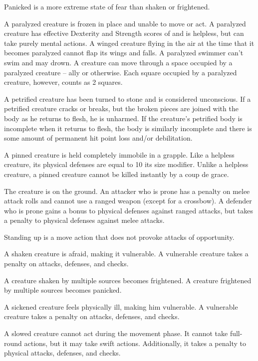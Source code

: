 Panicked is a more extreme state of fear than shaken or frightened.

 A paralyzed creature is frozen in place and unable to move or act. A paralyzed creature has effective Dexterity and Strength scores of  and is helpless, but can take purely mental actions. A winged creature flying in the air at the time that it becomes paralyzed cannot flap its wings and falls. A paralyzed swimmer can't swim and may drown. A creature can move through a space occupied by a paralyzed creature -- ally or otherwise. Each square occupied by a paralyzed creature, however, counts as 2 squares.

 A petrified creature has been turned to stone and is considered unconscious. If a petrified creature cracks or breaks, but the broken pieces are joined with the body as he returns to flesh, he is unharmed. If the creature's petrified body is incomplete when it returns to flesh, the body is similarly incomplete and there is some amount of permanent hit point loss and/or debilitation.

 A pinned creature is held completely immobile in a grapple. Like a helpless creature, its physical defenses are equal to 10 \add its size modifier. Unlike a helpless creature, a pinned creature cannot be killed instantly by a coup de grace.

 The creature is on the ground. An attacker who is prone has a  penalty on melee attack rolls and cannot use a ranged weapon (except for a crossbow). A defender who is prone gains a  bonus to physical defenses against ranged attacks, but takes a  penalty to physical defenses against melee attacks.

Standing up is a move action that does not provoke attacks of opportunity.

 A shaken creature is afraid, making it vulnerable. A vulnerable creature takes a  penalty on attacks, defenses, and checks.

A creature shaken by multiple sources becomes frightened. A creature frightened by multiple sources becomes panicked.

 A sickened creature feels physically ill, making him vulnerable. A vulnerable creature takes a  penalty on attacks, defenses, and checks.

 A slowed creature cannot act during the movement phase. It cannot take full-round actions, but it may take swift actions. Additionally, it takes a  penalty to physical attacks, defenses, and checks.

